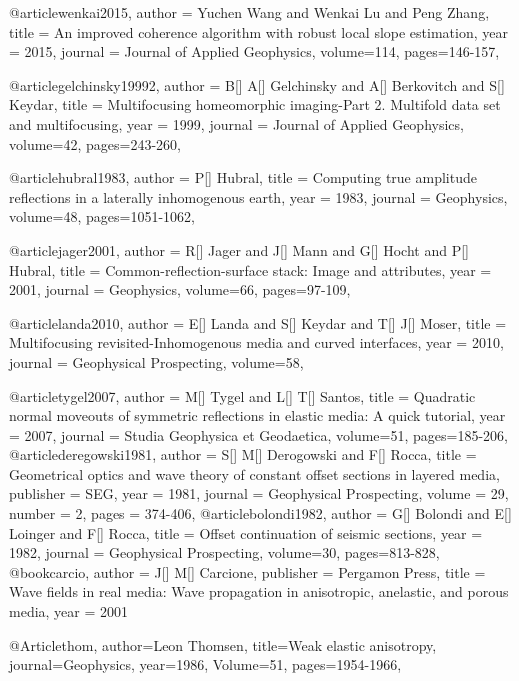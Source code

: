 @article{wenkai2015,
  author =	 {Yuchen Wang and Wenkai Lu and Peng Zhang},
  title =	 {An improved coherence algorithm with robust local slope estimation},
  year =	 2015,
  journal =	 {Journal of Applied Geophysics},
  volume={114},
 pages=146-157,
}

@article{gelchinsky19992,
  author =	 {B[] A[] Gelchinsky and A[] Berkovitch and S[] Keydar},
  title =	 {Multifocusing homeomorphic imaging-Part 2. Multifold data set and multifocusing},
  year =	 1999,
  journal =	 {Journal of Applied Geophysics},
  volume={42},
 pages=243-260,
}

@article{hubral1983,
  author =	 {P[] Hubral},
  title =	 {Computing true amplitude reflections in a laterally inhomogenous earth},
  year =	 1983,
  journal =	 {Geophysics},
  volume={48},
 pages=1051-1062,
}

@article{jager2001,
  author =	 {R[] Jager and J[] Mann and G[] Hocht and P[] Hubral},
  title =	 {Common-reflection-surface stack: Image and attributes},
  year =	 2001,
  journal =	 {Geophysics},
  volume={66},
 pages=97-109,
}

@article{landa2010,
  author =	 {E[] Landa and S[] Keydar and T[] J[] Moser},
  title =	 {Multifocusing revisited-Inhomogenous media and curved interfaces},
  year =	 2010,
  journal =	 {Geophysical Prospecting},
  volume={58},
}

@article{tygel2007,
  author =	 {M[] Tygel and L[] T[] Santos},
  title =	 {Quadratic normal moveouts of symmetric reflections in elastic media: A quick tutorial},
  year =	 2007,
  journal =	 {Studia Geophysica et Geodaetica},
  volume={51},
 pages=185-206,
}
@article{deregowski1981,
  author =	 {S[] M[] Derogowski and F[] Rocca},
  title =	 {Geometrical optics and wave theory of constant offset sections in layered media},
  publisher =	 {SEG},
  year =	 1981,
  journal =	 {Geophysical Prospecting},
  volume =	 29,
  number =	 2,
  pages =	 {374-406},
}
@article{bolondi1982,
  author =	 {G[] Bolondi and E[] Loinger and F[] Rocca},
  title =	 {Offset continuation of seismic sections},
  year =	 1982,
  journal =	 {Geophysical Prospecting},
  volume={30},
 pages=813-828,
}
@book{carcio,
   author = {J[] M[] Carcione},
   publisher = {Pergamon Press},
   title = {Wave fields in real media: Wave propagation in anisotropic, anelastic, and porous media},
   year = {2001}
}

@Article{thom,
  author={Leon Thomsen},
  title={Weak elastic anisotropy},
  journal={Geophysics},
  year=1986,
  Volume=51,
  pages={1954-1966},
}


